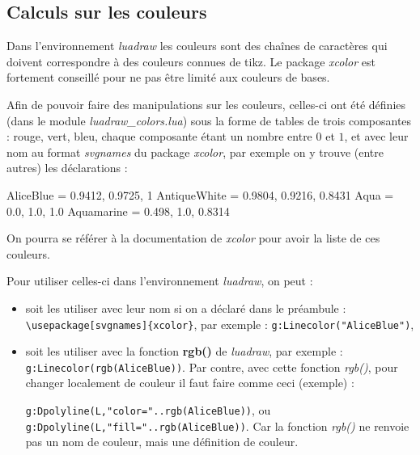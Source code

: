 \subsection{Calculs sur les couleurs}

Dans l'environnement \emph{luadraw} les couleurs sont des chaînes de caractères qui doivent correspondre à des couleurs connues de tikz. Le package \emph{xcolor} est fortement conseillé pour ne pas être limité aux couleurs de bases.

Afin de pouvoir faire des manipulations sur les couleurs, celles-ci ont été définies (dans le module \emph{luadraw\_colors.lua}) sous la forme de tables de trois composantes : rouge, vert, bleu, chaque composante étant un nombre entre $0$ et $1$, et avec leur nom au format \emph{svgnames} du package \emph{xcolor}, par exemple on y trouve (entre autres) les déclarations :
\begin{Luacode}
AliceBlue = {0.9412, 0.9725, 1}
AntiqueWhite = {0.9804, 0.9216, 0.8431}
Aqua = {0.0, 1.0, 1.0}
Aquamarine = {0.498, 1.0, 0.8314}
\end{Luacode}
On pourra se référer à la documentation de \emph{xcolor} pour avoir la liste de ces couleurs.

Pour utiliser celles-ci dans l'environnement \emph{luadraw}, on peut :
\begin{itemize}
    \item soit les utiliser avec leur nom si on a déclaré dans le préambule : \verb|\usepackage[svgnames]{xcolor}|, par exemple : \texttt{g:Linecolor("AliceBlue")},
    \item soit les utiliser avec la fonction \textbf{rgb()} de \emph{luadraw}, par exemple : \texttt{g:Linecolor(rgb(AliceBlue))}. Par contre, avec cette fonction \emph{rgb()}, pour changer localement de couleur il faut faire comme ceci (exemple) : \par
    \texttt{g:Dpolyline(L,"color="..rgb(AliceBlue))}, ou \texttt{g:Dpolyline(L,"fill="..rgb(AliceBlue))}. Car la fonction \emph{rgb()} ne renvoie pas un nom de couleur, mais une définition de couleur.
\end{itemize}

